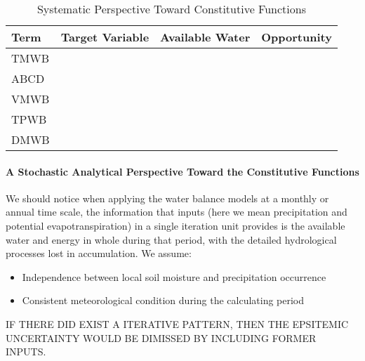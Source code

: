 \begin{table}[H]
\caption{Systematic Perspective Toward Constitutive Functions}
\begin{center}
\begin{tabular}{lccr}
\toprule[1.5 pt]
Term  & Target Variable & Available Water & Opportunity \\
\midrule[1 pt]
TMWB
&
         
& 
       
&        \\
ABCD
&
         
& 
       
&        \\
VMWB
&
         
& 
       
&        \\
TPWB
&
         
& 
       
&        \\
DMWB
&
         
& 
       
&        \\
\bottomrule[1.5 pt]
\end{tabular}
\end{center}
\end{table}
{\centering \paragraph{A Stochastic Analytical Perspective Toward the Constitutive Functions}}


We should notice when applying the water balance models at a monthly or annual  time scale, the information that inputs (here we mean precipitation and potential evapotranspiration) in a single iteration unit provides is the available water and energy in whole during that period, with the detailed hydrological processes lost in accumulation. 
We assume:
\begin{itemize}
\item Independence between local soil moisture and precipitation occurrence
\item Consistent meteorological condition during the calculating period

\end{itemize}  




IF THERE DID EXIST A ITERATIVE PATTERN, THEN THE EPSITEMIC UNCERTAINTY WOULD BE DIMISSED BY INCLUDING FORMER INPUTS.

